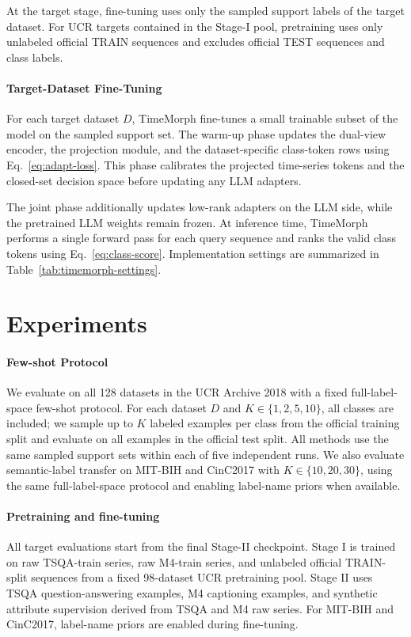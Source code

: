 \documentclass[10pt,journal,compsoc]{IEEEtran}
\begin{document}
At the target stage, fine-tuning uses only the sampled support labels of the target dataset.
For UCR targets contained in the Stage-I pool, pretraining uses only unlabeled official TRAIN sequences and excludes official TEST sequences and class labels.

\paragraph{Target-Dataset Fine-Tuning}

For each target dataset $D$, TimeMorph fine-tunes a small trainable subset of the model on the sampled support set.
The warm-up phase updates the dual-view encoder, the projection module, and the dataset-specific class-token rows using Eq.~\eqref{eq:adapt-loss}.
This phase calibrates the projected time-series tokens and the closed-set decision space before updating any LLM adapters.

The joint phase additionally updates low-rank adapters on the LLM side, while the pretrained LLM weights remain frozen.
At inference time, TimeMorph performs a single forward pass for each query sequence and ranks the valid class tokens using Eq.~\eqref{eq:class-score}.
Implementation settings are summarized in Table~\ref{tab:timemorph-settings}.

\section{Experiments}
\label{sec:experiments}

\paragraph{Few-shot Protocol}
We evaluate on all 128 datasets in the UCR Archive 2018 with a fixed full-label-space few-shot protocol.
For each dataset $D$ and $K\in\{1,2,5,10\}$, all classes are included; we sample up to $K$ labeled examples per class from the official training split and evaluate on all examples in the official test split.
All methods use the same sampled support sets within each of five independent runs.
We also evaluate semantic-label transfer on MIT-BIH and CinC2017 with $K\in\{10,20,30\}$, using the same full-label-space protocol and enabling label-name priors when available.


\paragraph{Pretraining and fine-tuning}
All target evaluations start from the final Stage-II checkpoint.
Stage I is trained on raw TSQA-train series, raw M4-train series, and unlabeled official TRAIN-split sequences from a fixed 98-dataset UCR pretraining pool.
Stage II uses TSQA question-answering examples, M4 captioning examples, and synthetic attribute supervision derived from TSQA and M4 raw series.
For MIT-BIH and CinC2017, label-name priors are enabled during fine-tuning.
\end{document}
